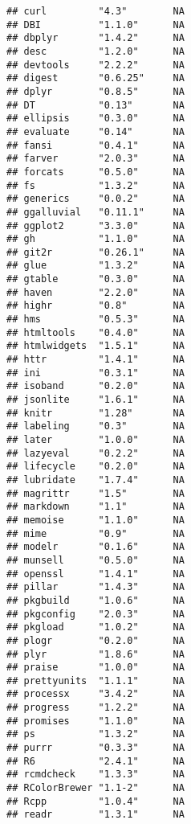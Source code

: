 \documentclass[]{book}
\begin{document}
\begin{verbatim}
## curl         "4.3"        NA           
## DBI          "1.1.0"      NA           
## dbplyr       "1.4.2"      NA           
## desc         "1.2.0"      NA           
## devtools     "2.2.2"      NA           
## digest       "0.6.25"     NA           
## dplyr        "0.8.5"      NA           
## DT           "0.13"       NA           
## ellipsis     "0.3.0"      NA           
## evaluate     "0.14"       NA           
## fansi        "0.4.1"      NA           
## farver       "2.0.3"      NA           
## forcats      "0.5.0"      NA           
## fs           "1.3.2"      NA           
## generics     "0.0.2"      NA           
## ggalluvial   "0.11.1"     NA           
## ggplot2      "3.3.0"      NA           
## gh           "1.1.0"      NA           
## git2r        "0.26.1"     NA           
## glue         "1.3.2"      NA           
## gtable       "0.3.0"      NA           
## haven        "2.2.0"      NA           
## highr        "0.8"        NA           
## hms          "0.5.3"      NA           
## htmltools    "0.4.0"      NA           
## htmlwidgets  "1.5.1"      NA           
## httr         "1.4.1"      NA           
## ini          "0.3.1"      NA           
## isoband      "0.2.0"      NA           
## jsonlite     "1.6.1"      NA           
## knitr        "1.28"       NA           
## labeling     "0.3"        NA           
## later        "1.0.0"      NA           
## lazyeval     "0.2.2"      NA           
## lifecycle    "0.2.0"      NA           
## lubridate    "1.7.4"      NA           
## magrittr     "1.5"        NA           
## markdown     "1.1"        NA           
## memoise      "1.1.0"      NA           
## mime         "0.9"        NA           
## modelr       "0.1.6"      NA           
## munsell      "0.5.0"      NA           
## openssl      "1.4.1"      NA           
## pillar       "1.4.3"      NA           
## pkgbuild     "1.0.6"      NA           
## pkgconfig    "2.0.3"      NA           
## pkgload      "1.0.2"      NA           
## plogr        "0.2.0"      NA           
## plyr         "1.8.6"      NA           
## praise       "1.0.0"      NA           
## prettyunits  "1.1.1"      NA           
## processx     "3.4.2"      NA           
## progress     "1.2.2"      NA           
## promises     "1.1.0"      NA           
## ps           "1.3.2"      NA           
## purrr        "0.3.3"      NA           
## R6           "2.4.1"      NA           
## rcmdcheck    "1.3.3"      NA           
## RColorBrewer "1.1-2"      NA           
## Rcpp         "1.0.4"      NA           
## readr        "1.3.1"      NA           

\end{verbatim}
\end{document}
